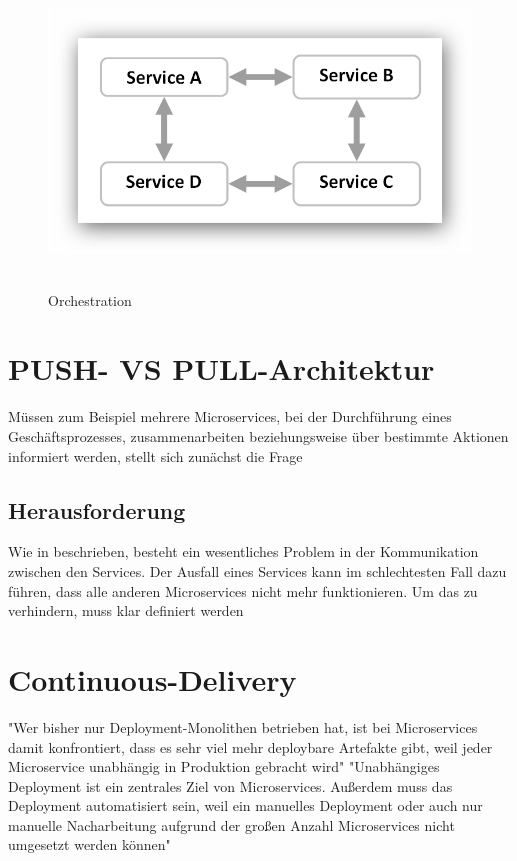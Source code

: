 \begin{figure}[htb]
    \centering 
    \includegraphics[width=\linewidth]{content/images/ServiceChoreography}\
    \caption[Orchestration]{Orchestration}
    \label{fig:ServiceOrchestration}  
\end{figure}

\section{PUSH- VS PULL-Architektur}
\label{sec:PushPullArchitektur}
Müssen zum Beispiel mehrere Microservices, bei der Durchführung eines Geschäftsprozesses, zusammenarbeiten beziehungsweise über bestimmte Aktionen informiert werden, stellt sich  zunächst die Frage

\subsection{Herausforderung}
\label{sec:Herausforderung}
Wie in \cite[S. 25]{EWolff2016:Microservices} beschrieben, besteht ein wesentliches Problem in der Kommunikation zwischen den Services. Der Ausfall eines Services kann im schlechtesten Fall dazu führen, dass alle anderen Microservices nicht mehr funktionieren. Um das zu verhindern, muss klar definiert werden


\section{Continuous-Delivery}
\label{sec:ContinuousDelivery}
"Wer bisher nur Deployment-Monolithen betrieben hat, ist bei Microservices damit konfrontiert, dass es sehr viel mehr deploybare Artefakte gibt, weil jeder Microservice unabhängig in Produktion gebracht wird"\cite[S. 241]{EWolff2016:Microservices}
"Unabhängiges Deployment ist ein zentrales Ziel von Microservices. Außerdem muss das Deployment automatisiert sein, weil ein manuelles Deployment oder auch nur manuelle Nacharbeitung aufgrund der großen Anzahl Microservices nicht umgesetzt werden können"\cite[S. 256]{EWolff2016:Microservices}
